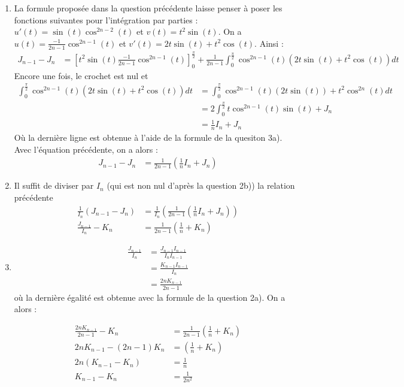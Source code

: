\documentclass[a4paper, 11pt,reqno]{article}
\begin{document}
\begin{correction}
\begin{enumerate}
\begin{enumerate}
\item La formule proposée dans la question précédente laisse penser à poser les fonctions suivantes pour l'intégration par parties :  
 $u'(t)= \sin(t)\cos^{2n-2}(t) $ et $v(t) =t^2\sin(t)$. On a $u(t)= \frac{-1}{2n-1}\cos^{2n-1}(t)$ et $v'(t) =2t\sin(t) +t^2 \cos(t)$. Ainsi :
 \begin{align*}
 J_{n-1}-J_n&= \left[ t^2  \sin(t) \frac{-1}{2n-1}\cos^{2n-1}(t)\right]_0^{\frac{\pi}{2}}   + \frac{1}{2n-1} \int_0^{\frac{\pi}{2}} \cos^{2n-1}(t)(2t\sin(t) +t^2 \cos(t))dt
 \end{align*}
Encore une fois, le crochet est nul et 
\begin{align*}
\int_0^{\frac{\pi}{2}} \cos^{2n-1}(t)(2t\sin(t) +t^2 \cos(t))dt &= \int_0^{\frac{\pi}{2}} \cos^{2n-1}(t)(2t\sin(t)) +t^2 \cos^{2n}(t)dt\\
&=2 \int_0^{\frac{\pi}{2}} t\cos^{2n-1}(t)\sin(t) +J_n\\
&= \frac{1}{n}I_n +J_n
\end{align*}
Où la dernière ligne est obtenue à l'aide de la formule de la quesiton 3a). 
Avec l'équation précédente, on a alors : 
\begin{align*}
J_{n-1} -J_n &= \frac{1}{2n-1} \left(  \frac{1}{n}I_n +J_n \right)
\end{align*}
\item 
Il suffit de diviser par $I_n$ (qui est non nul d'après la question 2b)) la relation précédente   
\begin{align*}
\frac{1}{I_n}(J_{n-1} -J_n) &= \frac{1}{I_n} \left(\frac{1}{2n-1} \left(  \frac{1}{n}I_n +J_n \right)\right)\\
\frac{J_{n-1}}{I_n} -K_n &=  \frac{1}{2n-1} \left(  \frac{1}{n} +K_n \right)
\end{align*}
\item 
\begin{align*}
\frac{J_{n-1}}{I_n} &= \frac{J_{n-1} I_{n-1}}{I_n I_{n-1}} \\
							&= \frac{K_{n-1} I_{n-1}}{I_n } \\	
							&= \frac{2n K_{n-1}}{2n-1 } 
\end{align*}
où la dernière égalité est obtenue avec la formule de la question 2a). On  a alors : 

\begin{align*}
\frac{2n K_{n-1} }{2n-1 }  - K_n &= \frac{1}{2n-1} \left(  \frac{1}{n} +K_n \right)\\
2n K_{n-1}  - (2n-1) K_n &=  \left(  \frac{1}{n} +K_n \right)\\
 2n(K_{n-1} -K_n) &= \frac{1}{n}\\
 K_{n-1}- K_n &= \frac{1}{2n^2}
\end{align*}





\end{enumerate}
\end{enumerate}
\end{correction}
\end{document}
